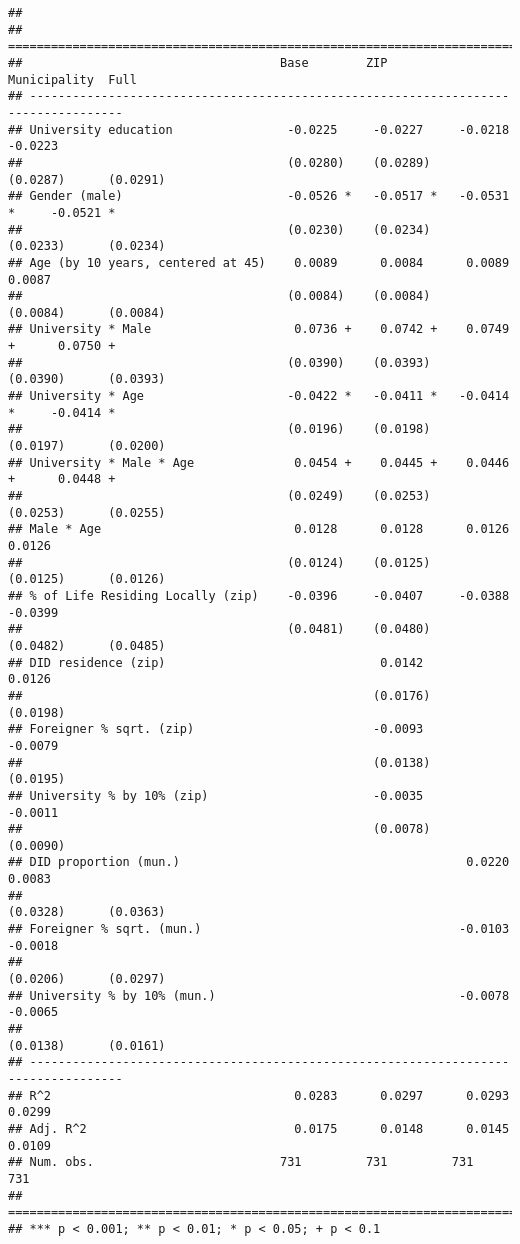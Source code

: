 \documentclass[
]{article}
\begin{document}
\begin{verbatim}
## 
## ===================================================================================
##                                    Base        ZIP         Municipality  Full      
## -----------------------------------------------------------------------------------
## University education                -0.0225     -0.0227     -0.0218       -0.0223  
##                                     (0.0280)    (0.0289)    (0.0287)      (0.0291) 
## Gender (male)                       -0.0526 *   -0.0517 *   -0.0531 *     -0.0521 *
##                                     (0.0230)    (0.0234)    (0.0233)      (0.0234) 
## Age (by 10 years, centered at 45)    0.0089      0.0084      0.0089        0.0087  
##                                     (0.0084)    (0.0084)    (0.0084)      (0.0084) 
## University * Male                    0.0736 +    0.0742 +    0.0749 +      0.0750 +
##                                     (0.0390)    (0.0393)    (0.0390)      (0.0393) 
## University * Age                    -0.0422 *   -0.0411 *   -0.0414 *     -0.0414 *
##                                     (0.0196)    (0.0198)    (0.0197)      (0.0200) 
## University * Male * Age              0.0454 +    0.0445 +    0.0446 +      0.0448 +
##                                     (0.0249)    (0.0253)    (0.0253)      (0.0255) 
## Male * Age                           0.0128      0.0128      0.0126        0.0126  
##                                     (0.0124)    (0.0125)    (0.0125)      (0.0126) 
## % of Life Residing Locally (zip)    -0.0396     -0.0407     -0.0388       -0.0399  
##                                     (0.0481)    (0.0480)    (0.0482)      (0.0485) 
## DID residence (zip)                              0.0142                    0.0126  
##                                                 (0.0176)                  (0.0198) 
## Foreigner % sqrt. (zip)                         -0.0093                   -0.0079  
##                                                 (0.0138)                  (0.0195) 
## University % by 10% (zip)                       -0.0035                   -0.0011  
##                                                 (0.0078)                  (0.0090) 
## DID proportion (mun.)                                        0.0220        0.0083  
##                                                             (0.0328)      (0.0363) 
## Foreigner % sqrt. (mun.)                                    -0.0103       -0.0018  
##                                                             (0.0206)      (0.0297) 
## University % by 10% (mun.)                                  -0.0078       -0.0065  
##                                                             (0.0138)      (0.0161) 
## -----------------------------------------------------------------------------------
## R^2                                  0.0283      0.0297      0.0293        0.0299  
## Adj. R^2                             0.0175      0.0148      0.0145        0.0109  
## Num. obs.                          731         731         731           731       
## ===================================================================================
## *** p < 0.001; ** p < 0.01; * p < 0.05; + p < 0.1
\end{verbatim}
\end{document}
